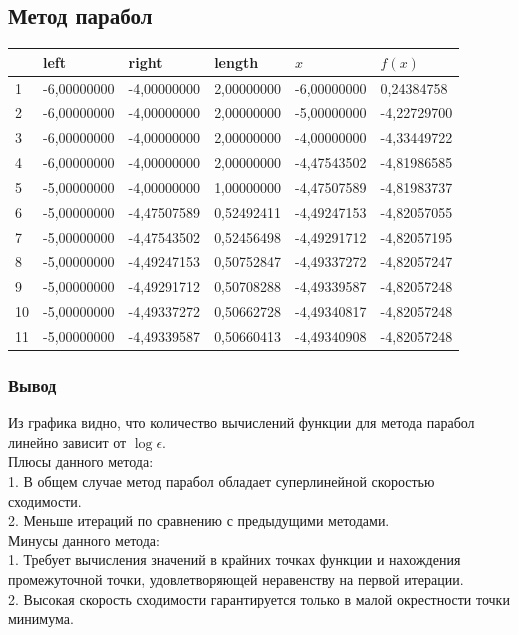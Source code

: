 \newpage

\subsection{Метод парабол}
\label{subsec:parabolasection}
\begin{center}
    \begin{tabular}{ | l | l | l | l | l | l |}
        \hline
        \textnumero{} & left        & right       & length     & $x$         & $f(x)$      \\ \hline
        1             & -6,00000000 & -4,00000000 & 2,00000000 & -6,00000000 & 0,24384758  \\
        2             & -6,00000000 & -4,00000000 & 2,00000000 & -5,00000000 & -4,22729700 \\
        3             & -6,00000000 & -4,00000000 & 2,00000000 & -4,00000000 & -4,33449722 \\
        4             & -6,00000000 & -4,00000000 & 2,00000000 & -4,47543502 & -4,81986585 \\
        5             & -5,00000000 & -4,00000000 & 1,00000000 & -4,47507589 & -4,81983737 \\
        6             & -5,00000000 & -4,47507589 & 0,52492411 & -4,49247153 & -4,82057055 \\
        7             & -5,00000000 & -4,47543502 & 0,52456498 & -4,49291712 & -4,82057195 \\
        8             & -5,00000000 & -4,49247153 & 0,50752847 & -4,49337272 & -4,82057247 \\
        9             & -5,00000000 & -4,49291712 & 0,50708288 & -4,49339587 & -4,82057248 \\
        10            & -5,00000000 & -4,49337272 & 0,50662728 & -4,49340817 & -4,82057248 \\
        11            & -5,00000000 & -4,49339587 & 0,50660413 & -4,49340908 & -4,82057248 \\
        \hline
    \end{tabular}
\end{center}

\subsubsection{Вывод}
{Из графика  видно, что количество вычислений функции для метода парабол линейно зависит от $\log\epsilon$. \\

Плюсы данного метода: \\
1. В общем случае метод парабол обладает суперлинейной скоростью сходимости. \\
2. Меньше итераций по сравнению с предыдущими методами. \\

Минусы данного метода: \\
1. Требует вычисления значений в крайних точках функции и нахождения промежуточной точки, удовлетворяющей неравенству на первой итерации. \\
2. Высокая скорость сходимости гарантируется только в малой окрестности точки минимума. \\}

